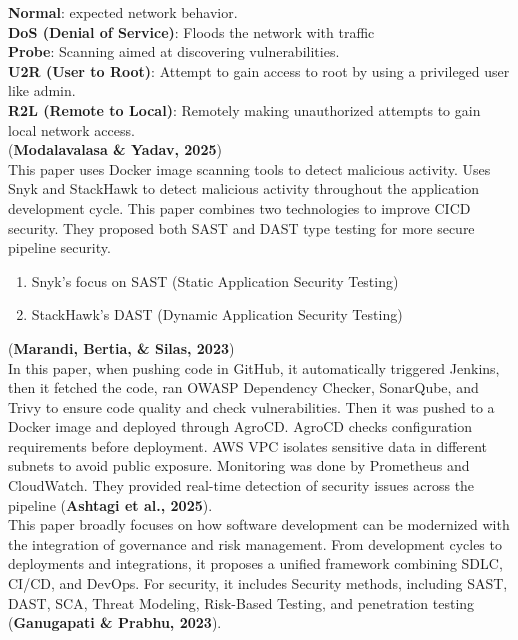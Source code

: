 \textbf{Normal}: expected network behavior.\\
\textbf{DoS (Denial of Service)}: Floods the network with traffic\\
\textbf{Probe}: Scanning aimed at discovering vulnerabilities.\\
\textbf{U2R (User to Root)}: Attempt to gain access to root by using a privileged user like admin.\\
\textbf{R2L (Remote to Local)}: Remotely making unauthorized attempts to gain local network access.\\
 (\textbf{Modalavalasa \& Yadav, 2025})\cite{Modalavalasa}\\
 
This paper uses Docker image scanning tools to detect malicious activity. Uses Snyk and StackHawk to detect malicious activity throughout the application development cycle. This paper combines two technologies to improve CICD security. They proposed both SAST and DAST type testing for more secure pipeline security.\\
\begin{enumerate}
    \item Snyk's focus on SAST (Static Application Security Testing)
    \item StackHawk's DAST (Dynamic Application Security Testing)
\end{enumerate}
(\textbf{Marandi, Bertia, \& Silas, 2023})\cite{Marandi}\\

In this paper, when pushing code in GitHub, it automatically triggered Jenkins, then it fetched the code, ran OWASP Dependency Checker, SonarQube, and Trivy to ensure code quality and check vulnerabilities. Then it was pushed to a Docker image and deployed through AgroCD. AgroCD checks configuration requirements before deployment. AWS VPC isolates sensitive data in different subnets to avoid public exposure. Monitoring was done by Prometheus and CloudWatch. They provided real-time detection of security issues across the pipeline (\textbf{Ashtagi et al., 2025})\cite{Ashtagi}.\\

This paper broadly focuses on how software development can be modernized with the integration of governance and risk management. From development cycles to deployments and integrations, it proposes a unified framework combining SDLC, CI/CD, and DevOps. For security, it includes Security methods, including SAST, DAST, SCA, Threat Modeling, Risk-Based Testing, and penetration testing (\textbf{Ganugapati \& Prabhu, 2023})\cite{Ganugapati}.\\

